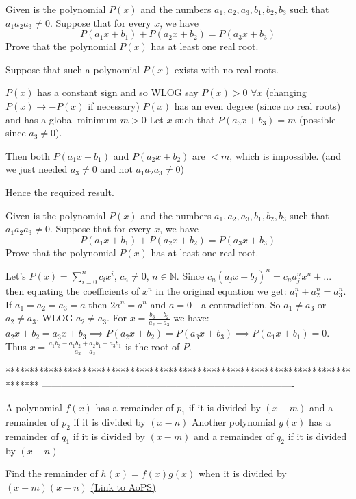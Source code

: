 \begin{solution}
	\begin{tcolorbox}Given is the polynomial $P(x)$ and the numbers $a_1,a_2,a_3,b_1,b_2,b_3$ such that $a_1a_2a_3\not=0$. Suppose that for every $x$, we have
\[P(a_1x+b_1)+P(a_2x+b_2)=P(a_3x+b_3)\]
Prove that the polynomial $P(x)$ has at least one real root.\end{tcolorbox}
Suppose that such a polynomial $P(x)$ exists with no real roots.

$P(x)$ has a constant sign and so WLOG say $P(x)>0$ $\forall x$ (changing $P(x)\to -P(x)$ if necessary)
$P(x)$ has an even degree (since no real roots) and has a global minimum $m>0$
Let $x$ such that $P(a_3x+b_3)=m$ (possible since $a_3\ne 0$).

Then both $P(a_1x+b_1)$ and $P(a_2x+b_2)$ are $<m$, which is impossible. (and we just needed $a_3\ne 0$ and not $a_1a_2a_3\ne 0$)

Hence the required result.
\end{solution}



\begin{solution}
	\begin{tcolorbox}Given is the polynomial $P(x)$ and the numbers $a_1,a_2,a_3,b_1,b_2,b_3$ such that $a_1a_2a_3\not=0$. Suppose that for every $x$, we have
\[P(a_1x+b_1)+P(a_2x+b_2)=P(a_3x+b_3)\]
Prove that the polynomial $P(x)$ has at least one real root.\end{tcolorbox}
Let's $P(x)=\sum_{i=0}^{n}c_ix^i$, $c_n \ne 0$, $n \in \mathbb{N}$. Since $c_n(a_jx+b_j)^n=c_na_j^nx^n+...$ then equating the coefficients of $x^n$ in the original equation we get: $a_1^n+a_2^n=a_3^n$.
If $a_1=a_2=a_3=a$ then $2a^n=a^n$ and $a=0$ - a contradiction.
So $a_1 \ne a_3$ or $a_2 \ne a_3$. WLOG $a_2 \ne a_3$. For $x=\frac{b_3-b_2}{a_2-a_3}$ we have: $a_2x+b_2=a_3x+b_3 \implies P(a_2x+b_2)=P(a_3x+b_3) \implies P(a_1x+b_1)=0$. Thus $x=\frac{a_1b_3-a_1b_2+a_2b_1-a_3b_1}{a_2-a_3}$ is the root of $P$.
\end{solution}
*******************************************************************************
-------------------------------------------------------------------------------

\begin{problem}
	A polynomial $f(x)$ has a remainder of $p_1$ if it is divided by $(x-m)$ and a remainder of $p_2$ if it is divided by $(x-n)$
Another polynomial $g(x)$ has a remainder of $q_1$ if it is divided by $(x-m)$ and a remainder of $q_2$ if it is divided by $(x-n)$

Find the remainder of $h(x) = f(x) g(x)$ when it is divided by $(x-m)(x-n)$
	\flushright \href{https://artofproblemsolving.com/community/c6h482499}{(Link to AoPS)}
\end{problem}



